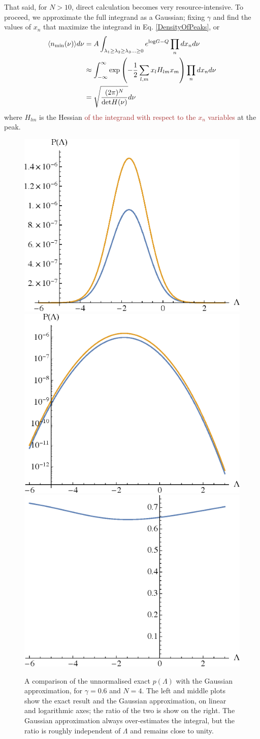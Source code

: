 \documentclass[12pt]{article}
\newcommand{\sh}[1]{\textcolor{brown}{#1}}
\begin{document}
That said, for $N>10$, direct calculation becomes very resource-intensive. To proceed, we approximate the full integrand as a Gaussian; fixing $\gamma$ and find the values of $x_n$ that maximize the integrand in Eq. \ref{DensityOfPeaks}, or 
%
\begin{align*}
\begin{split}
\langle n_{\rm min}(\nu)\rangle d\nu &=A\int_{\lambda_1 \geq \lambda_2 \geq \lambda_3 \ldots \geq 0} e^{\mathrm{log}G-Q} \prod_n dx_n d\nu\\
&\approx \int_{-\infty}^{\infty} \exp\left(-\frac{1}{2}\sum_{l,m}x_lH_{lm}x_m\right)  \prod_n dx_n d\nu \\
&= \sqrt{\frac{(2\pi)^N}{\mathrm{det} H(\nu)}}d\nu
\end{split}
\end{align*}
%
\noindent where $H_{lm}$ is the Hessian \sh{of the integrand with respect to the $x_n$ variables} at the peak.
\begin{figure} 
  \centering
  \includegraphics[width=.3 \linewidth]{PLam_approx.eps} \hfill
   \includegraphics[width=.3 \linewidth]{PLam_approx_log.eps} \hfill
    \includegraphics[width=.3 \linewidth]{PLam_ratio.eps}
  \caption{  
  A comparison of the unnormalised exact $p(\Lambda)$ with the Gaussian approximation, for $\gamma=0.6$ and $N=4$. The left and middle plots show the exact result and the Gaussian approximation, on linear and logarithmic axes; the ratio of the two is show on the right. The Gaussian approximation always  over-estimates the integral, but the ratio is roughly independent of $\Lambda$ and remains close to unity. }
  \label{Comparison}
\end{figure}
\end{document}

